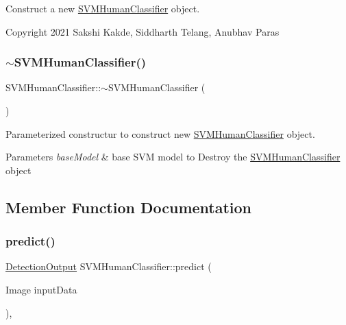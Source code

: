Construct a new \hyperlink{classSVMHumanClassifier}{S\+V\+M\+Human\+Classifier} object. 

Copyright 2021 Sakshi Kakde, Siddharth Telang, Anubhav Paras \mbox{\label{classSVMHumanClassifier_a875ce0f61e85c8254f008b29f2c3a9b9}} 
\subsubsection{\texorpdfstring{$\sim$\+S\+V\+M\+Human\+Classifier()}{~SVMHumanClassifier()}}
{\footnotesize\ttfamily S\+V\+M\+Human\+Classifier\+::$\sim$\+S\+V\+M\+Human\+Classifier (\begin{DoxyParamCaption}{ }\end{DoxyParamCaption})\hspace{0.3cm}{\ttfamily [virtual]}}



Parameterized constructur to construct new \hyperlink{classSVMHumanClassifier}{S\+V\+M\+Human\+Classifier} object. 


\begin{DoxyParams}{Parameters}
{\em base\+Model} & base S\+VM model to Destroy the \hyperlink{classSVMHumanClassifier}{S\+V\+M\+Human\+Classifier} object \\
\hline
\end{DoxyParams}


\subsection{Member Function Documentation}
\mbox{\label{classSVMHumanClassifier_a14a416a22355b1426d7611082dfa2464}} 
\subsubsection{\texorpdfstring{predict()}{predict()}}
{\footnotesize\ttfamily \hyperlink{classData}{Detection\+Output} S\+V\+M\+Human\+Classifier\+::predict (\begin{DoxyParamCaption}\item[{Image}]{input\+Data }\end{DoxyParamCaption})\hspace{0.3cm}{\ttfamily [override]}, {\ttfamily [virtual]}}



